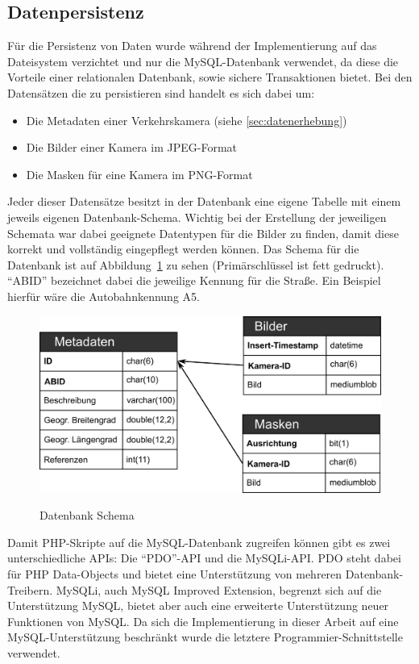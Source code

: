 \subsection{Datenpersistenz}
Für die Persistenz von Daten wurde während der Implementierung auf das Dateisystem verzichtet und nur die MySQL-Datenbank verwendet, da diese die Vorteile einer relationalen Datenbank, sowie sichere Transaktionen bietet.
Bei den Datensätzen die zu persistieren sind handelt es sich dabei um:
\begin{itemize}
\item{Die Metadaten einer Verkehrskamera (siehe \ref{sec:datenerhebung})}
\item{Die Bilder einer Kamera im JPEG-Format}
\item{Die Masken für eine Kamera im PNG-Format}
\end{itemize}
Jeder dieser Datensätze besitzt in der Datenbank eine eigene Tabelle mit einem jeweils eigenen Datenbank-Schema. 
Wichtig bei der Erstellung der jeweiligen Schemata war dabei geeignete Datentypen für die Bilder zu finden, damit diese korrekt und vollständig eingepflegt werden können.
Das Schema für die Datenbank ist auf Abbildung~\ref{fig:dbschema} zu sehen (Primärschlüssel ist fett gedruckt). "`ABID"' bezeichnet dabei die jeweilige Kennung für die Straße. Ein Beispiel hierfür wäre die Autobahnkennung A5.
\begin{figure}[ht]
   \centering
     \includegraphics[width=15cm]{Bilder/db-schema} \\
 \caption{Datenbank Schema}
 \label{fig:dbschema}
\end{figure}

Damit PHP-Skripte auf die MySQL-Datenbank zugreifen können gibt es zwei unterschiedliche APIs: Die "`PDO"'-API und die MySQLi-API. 
PDO steht dabei für PHP Data-Objects und bietet eine Unterstützung von mehreren Datenbank-Treibern. 
MySQLi, auch MySQL Improved Extension, begrenzt sich auf die Unterstützung MySQL, bietet aber auch eine erweiterte Unterstützung neuer Funktionen von MySQL.
Da sich die Implementierung in dieser Arbeit auf eine MySQL-Unterstützung beschränkt wurde die letztere Programmier-Schnittstelle verwendet.

